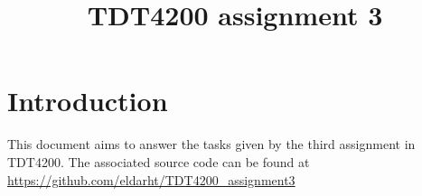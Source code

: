 \documentclass{article}
\title{TDT4200 assignment 3}
\begin{document}
\maketitle
\section{Introduction}
This document aims to answer the tasks given by the third assignment in TDT4200.
The associated source code can be found at \url{https://github.com/eldarht/TDT4200_assignment3}
\end{document}

